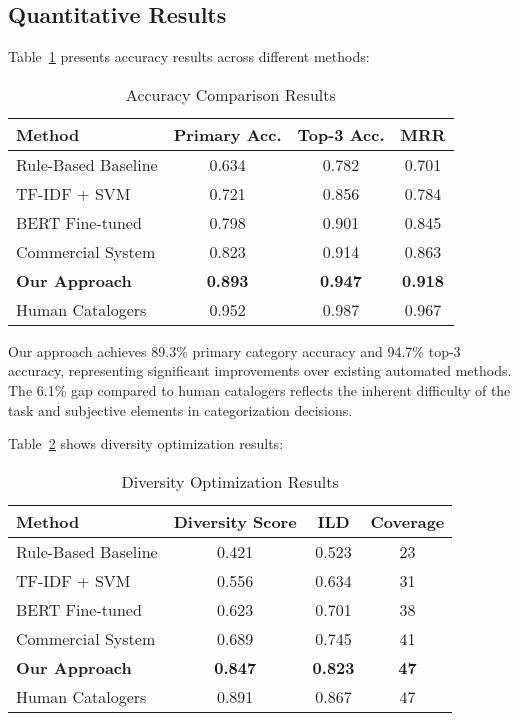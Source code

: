 \documentclass{article}
\begin{document}
\subsection{Quantitative Results}

Table~\ref{tab:accuracy_results} presents accuracy results across different methods:

\begin{table}[ht]
\centering
\caption{Accuracy Comparison Results}
\label{tab:accuracy_results}
\begin{tabular}{@{}lccc@{}}
\toprule
Method & Primary Acc. & Top-3 Acc. & MRR \\
\midrule
Rule-Based Baseline & 0.634 & 0.782 & 0.701 \\
TF-IDF + SVM & 0.721 & 0.856 & 0.784 \\
BERT Fine-tuned & 0.798 & 0.901 & 0.845 \\
Commercial System & 0.823 & 0.914 & 0.863 \\
\textbf{Our Approach} & \textbf{0.893} & \textbf{0.947} & \textbf{0.918} \\
Human Catalogers & 0.952 & 0.987 & 0.967 \\
\bottomrule
\end{tabular}
\end{table}

Our approach achieves 89.3\% primary category accuracy and 94.7\% top-3 accuracy, representing significant improvements over existing automated methods. The 6.1\% gap compared to human catalogers reflects the inherent difficulty of the task and subjective elements in categorization decisions.

Table~\ref{tab:diversity_results} shows diversity optimization results:

\begin{table}[ht]
\centering
\caption{Diversity Optimization Results}
\label{tab:diversity_results}
\begin{tabular}{@{}lccc@{}}
\toprule
Method & Diversity Score & ILD & Coverage \\
\midrule
Rule-Based Baseline & 0.421 & 0.523 & 23 \\
TF-IDF + SVM & 0.556 & 0.634 & 31 \\
BERT Fine-tuned & 0.623 & 0.701 & 38 \\
Commercial System & 0.689 & 0.745 & 41 \\
\textbf{Our Approach} & \textbf{0.847} & \textbf{0.823} & \textbf{47} \\
Human Catalogers & 0.891 & 0.867 & 47 \\
\bottomrule
\end{tabular}
\end{table}
\end{document}
